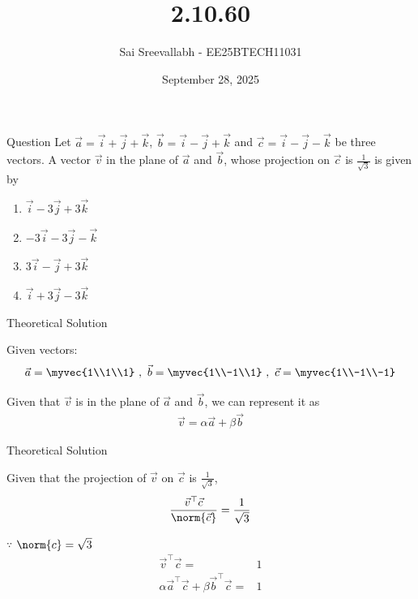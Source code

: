 \documentclass{beamer}
\title{2.10.60}
\author{Sai Sreevallabh - EE25BTECH11031}
\date{September 28, 2025}
\begin{document}
\frame{\titlepage}

\begin{frame}{Question}
Let $\vec{a}= \vec{i}+\vec{j}+\vec{k}$, $\vec{b}=\vec{i}-\vec{j}+\vec{k}$ and $\vec{c}=\vec{i}-\vec{j}-\vec{k}$ be three vectors. A vector $\vec{v}$ in the plane of $\vec{a}$ and $\vec{b}$, whose projection on $\vec{c}$ is $\frac{1}{\sqrt{3}}$ is given by

\begin{enumerate}
    \item $\vec{i}-3\vec{j}+3\vec{k}$
    \item $-3\vec{i}-3\vec{j}-\vec{k}$
    \item $3\vec{i}-\vec{j}+3\vec{k}$
    \item $\vec{i}+3\vec{j}-3\vec{k}$
\end{enumerate}

\end{frame}


\begin{frame}{Theoretical Solution}

Given vectors: 
\begin{align}
    \vec{a} = \myvec{1\\1\\1} \ , \ \vec{b} = \myvec{1\\-1\\1} \ , \ \vec{c} = \myvec{1\\-1\\-1}
\end{align}

Given that $\vec{v}$ is in the plane of $\vec{a}$ and $\vec{b}$, we can represent it as
\begin{align}
    \vec{v} = \alpha\vec{a} + \beta\vec{b}
\end{align}

\end{frame}

\begin{frame}{Theoretical Solution}

Given that the projection of $\vec{v}$ on $\vec{c}$ is $\frac{1}{\sqrt{3}}$, 
\begin{align}
    \frac{\vec{v}^\top\vec{c}}{\norm{\vec{c}}} = \frac{1}{\sqrt{3}}
\end{align}

$\because$ $\norm{c} = \sqrt{3}$
\begin{align}
    \vec{v}^\top\vec{c} =& 1\\
    \alpha\vec{a}^\top\vec{c} + \beta\vec{b}^\top\vec{c} =& 1
\end{align}

\end{frame}
\end{document}
